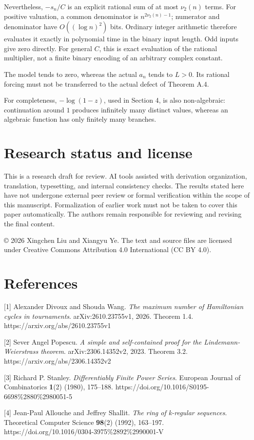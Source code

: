 \documentclass[11pt,a4paper]{article}
\begin{document}
Nevertheless, $-s_n/C$ is an explicit rational sum of at most $\nu_2(n)$ terms. For positive valuation, a common denominator is $n^{2\nu_2(n)-1}$; numerator and denominator have $O((\log n)^2)$ bits. Ordinary integer arithmetic therefore evaluates it exactly in polynomial time in the binary input length. Odd inputs give zero directly. For general $C$, this is exact evaluation of the rational multiplier, not a finite binary encoding of an arbitrary complex constant.

The model tends to zero, whereas the actual $a_n$ tends to $L>0$. Its rational forcing must not be transferred to the actual defect of Theorem A.4.

For completeness, $-\log(1-z)$, used in Section 4, is also non-algebraic: continuation around $1$ produces infinitely many distinct values, whereas an algebraic function has only finitely many branches.

\section*{Research status and license}
This is a research draft for review. AI tools assisted with derivation organization, translation, typesetting, and internal consistency checks. The results stated here have not undergone external peer review or formal verification within the scope of this manuscript. Formalization of earlier work must not be taken to cover this paper automatically. The authors remain responsible for reviewing and revising the final content.

© 2026 Xingchen Liu and Xiangyu Ye. The text and source files are licensed under Creative Commons Attribution 4.0 International (CC BY 4.0).

\section*{References}
[1] Alexander Divoux and Shouda Wang. \emph{The maximum number of Hamiltonian cycles in tournaments}. arXiv:2610.23755v1, 2026. Theorem 1.4. https://arxiv.org/abs/2610.23755v1

[2] Sever Angel Popescu. \emph{A simple and self-contained proof for the Lindemann-Weierstrass theorem}. arXiv:2306.14352v2, 2023. Theorem 3.2. https://arxiv.org/abs/2306.14352v2

[3] Richard P. Stanley. \emph{Differentiably Finite Power Series}. European Journal of Combinatorics \textbf{1}(2) (1980), 175–188. https://doi.org/10.1016/S0195-6698\%2880\%2980051-5

[4] Jean-Paul Allouche and Jeffrey Shallit. \emph{The ring of k-regular sequences}. Theoretical Computer Science \textbf{98}(2) (1992), 163–197. https://doi.org/10.1016/0304-3975\%2892\%2990001-V
\end{document}
